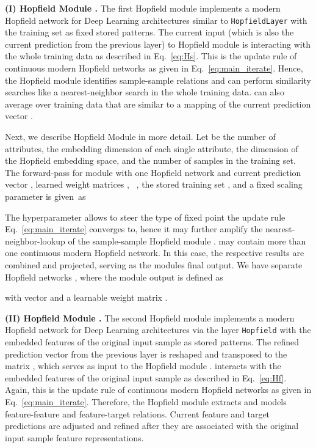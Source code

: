 \documentclass{article}
\theoremstyle{plain}
\theoremstyle{definition}
\theoremstyle{remark}
\begin{document}
{\bf (I) Hopfield Module .} 
The first Hopfield module  implements a modern Hopfield network for Deep Learning architectures
similar to {\tt HopfieldLayer} \citep{Ramsauer:21,Ramsauer:20} 
with the training set as fixed stored patterns.
The current input  (which is also the current prediction from the previous
layer) to Hopfield module 
is interacting with the whole training data 
as described in Eq.~\eqref{eq:Hs}.
This is the update rule of 
continuous modern Hopfield networks as given in Eq.~\eqref{eq:main_iterate}.
Hence, the Hopfield module  identifies sample-sample relations
and can perform similarity searches like a nearest-neighbor search 
in the whole training data.
 can also average over training data that 
are similar to a mapping of the current prediction vector .

Next, we describe Hopfield Module  in more detail.
Let  be the number of attributes, 
 the embedding dimension of each single attribute, 
 the dimension of the Hopfield embedding space, and  the number of samples in the training set. 
The forward-pass for module  with one Hopfield network and
current prediction vector , 
learned weight matrices , \ , the stored training set , and a fixed scaling parameter 
is given~as

The hyperparameter  allows to steer the type of fixed point 
the update rule Eq.~\eqref{eq:main_iterate} converges to, 
hence it may further amplify the nearest-neighbor-lookup of the sample-sample Hopfield module .  may contain more than one 
continuous modern Hopfield network.
In this case, the respective results are combined and projected, 
serving as the modules final output. 
We have  separate Hopfield networks , where the module output is defined as

with vector 
and a learnable weight matrix .

{\bf (II) Hopfield Module .} 
The second Hopfield module  implements a modern Hopfield network for Deep Learning architectures
via the layer {\tt Hopfield} \citep{Ramsauer:21,Ramsauer:20} 
with the embedded features of the original input sample as stored patterns.
The refined prediction vector from the previous layer
is reshaped and transposed
to the matrix , which serves as input to
the Hopfield module .
 interacts with the embedded features
of the original input sample
as described in Eq.~\eqref{eq:Hf}.
Again, this is the update rule of 
continuous modern Hopfield networks as given in Eq.~\eqref{eq:main_iterate}.
Therefore, the Hopfield module  extracts and models
feature-feature and feature-target relations.
Current feature and target predictions are adjusted and refined after they are associated with the original input sample feature representations.
\end{document}
